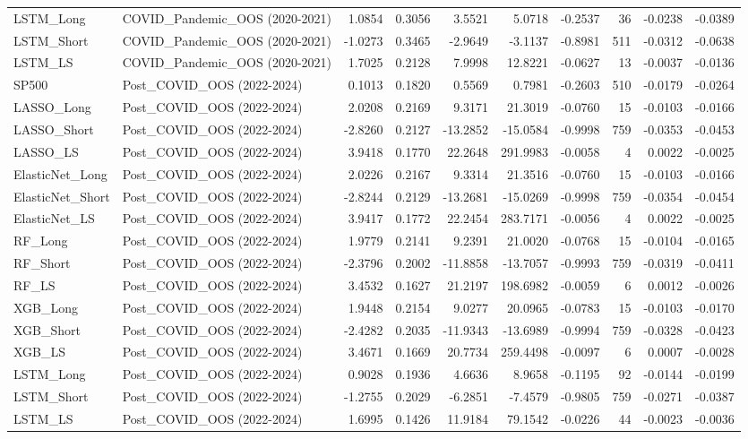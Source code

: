\begin{tabular}{llrrrrrrrr}
\cline{1-10}
LSTM\_Long & COVID\_Pandemic\_OOS (2020-2021) & 1.0854 & 0.3056 & 3.5521 & 5.0718 & -0.2537 & 36 & -0.0238 & -0.0389 \\
\cline{1-10}
LSTM\_Short & COVID\_Pandemic\_OOS (2020-2021) & -1.0273 & 0.3465 & -2.9649 & -3.1137 & -0.8981 & 511 & -0.0312 & -0.0638 \\
\cline{1-10}
LSTM\_LS & COVID\_Pandemic\_OOS (2020-2021) & 1.7025 & 0.2128 & 7.9998 & 12.8221 & -0.0627 & 13 & -0.0037 & -0.0136 \\
\cline{1-10}
SP500 & Post\_COVID\_OOS (2022-2024) & 0.1013 & 0.1820 & 0.5569 & 0.7981 & -0.2603 & 510 & -0.0179 & -0.0264 \\
\cline{1-10}
LASSO\_Long & Post\_COVID\_OOS (2022-2024) & 2.0208 & 0.2169 & 9.3171 & 21.3019 & -0.0760 & 15 & -0.0103 & -0.0166 \\
\cline{1-10}
LASSO\_Short & Post\_COVID\_OOS (2022-2024) & -2.8260 & 0.2127 & -13.2852 & -15.0584 & -0.9998 & 759 & -0.0353 & -0.0453 \\
\cline{1-10}
LASSO\_LS & Post\_COVID\_OOS (2022-2024) & 3.9418 & 0.1770 & 22.2648 & 291.9983 & -0.0058 & 4 & 0.0022 & -0.0025 \\
\cline{1-10}
ElasticNet\_Long & Post\_COVID\_OOS (2022-2024) & 2.0226 & 0.2167 & 9.3314 & 21.3516 & -0.0760 & 15 & -0.0103 & -0.0166 \\
\cline{1-10}
ElasticNet\_Short & Post\_COVID\_OOS (2022-2024) & -2.8244 & 0.2129 & -13.2681 & -15.0269 & -0.9998 & 759 & -0.0354 & -0.0454 \\
\cline{1-10}
ElasticNet\_LS & Post\_COVID\_OOS (2022-2024) & 3.9417 & 0.1772 & 22.2454 & 283.7171 & -0.0056 & 4 & 0.0022 & -0.0025 \\
\cline{1-10}
RF\_Long & Post\_COVID\_OOS (2022-2024) & 1.9779 & 0.2141 & 9.2391 & 21.0020 & -0.0768 & 15 & -0.0104 & -0.0165 \\
\cline{1-10}
RF\_Short & Post\_COVID\_OOS (2022-2024) & -2.3796 & 0.2002 & -11.8858 & -13.7057 & -0.9993 & 759 & -0.0319 & -0.0411 \\
\cline{1-10}
RF\_LS & Post\_COVID\_OOS (2022-2024) & 3.4532 & 0.1627 & 21.2197 & 198.6982 & -0.0059 & 6 & 0.0012 & -0.0026 \\
\cline{1-10}
XGB\_Long & Post\_COVID\_OOS (2022-2024) & 1.9448 & 0.2154 & 9.0277 & 20.0965 & -0.0783 & 15 & -0.0103 & -0.0170 \\
\cline{1-10}
XGB\_Short & Post\_COVID\_OOS (2022-2024) & -2.4282 & 0.2035 & -11.9343 & -13.6989 & -0.9994 & 759 & -0.0328 & -0.0423 \\
\cline{1-10}
XGB\_LS & Post\_COVID\_OOS (2022-2024) & 3.4671 & 0.1669 & 20.7734 & 259.4498 & -0.0097 & 6 & 0.0007 & -0.0028 \\
\cline{1-10}
LSTM\_Long & Post\_COVID\_OOS (2022-2024) & 0.9028 & 0.1936 & 4.6636 & 8.9658 & -0.1195 & 92 & -0.0144 & -0.0199 \\
\cline{1-10}
LSTM\_Short & Post\_COVID\_OOS (2022-2024) & -1.2755 & 0.2029 & -6.2851 & -7.4579 & -0.9805 & 759 & -0.0271 & -0.0387 \\
\cline{1-10}
LSTM\_LS & Post\_COVID\_OOS (2022-2024) & 1.6995 & 0.1426 & 11.9184 & 79.1542 & -0.0226 & 44 & -0.0023 & -0.0036 \\
\cline{1-10}
\bottomrule
\end{tabular}
